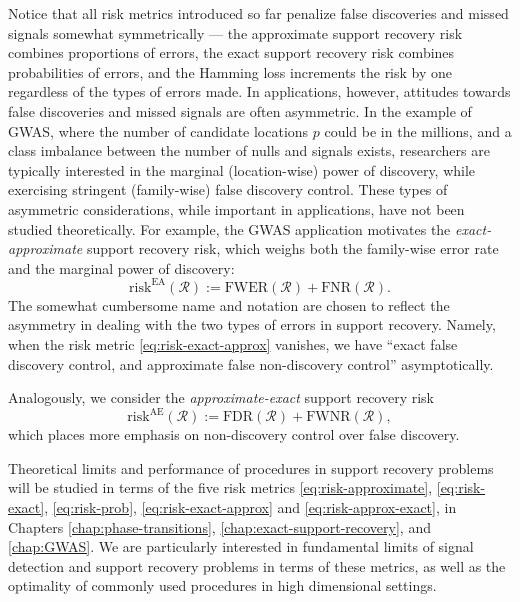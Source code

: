 Notice that all risk metrics introduced so far penalize false discoveries and missed signals somewhat symmetrically --- the approximate support recovery risk combines proportions of errors, the exact support recovery risk combines probabilities of errors, and the Hamming loss increments the risk by one regardless of the types of errors made.
In applications, however, attitudes towards false discoveries and missed signals are often asymmetric.
In the example of GWAS, where the number of candidate locations $p$ could be in the millions, and a class imbalance between the number of nulls and signals exists, researchers are typically interested in the marginal (location-wise) power of discovery, while exercising stringent (family-wise) false discovery control. 
These types of asymmetric considerations, while important in applications, have not been studied theoretically.  
For example, the GWAS application motivates the \emph{exact-approximate} support recovery risk, which weighs both the family-wise error rate and the marginal power of discovery:
\begin{equation} \label{eq:risk-exact-approx}
    \mathrm{risk}^{\mathrm{EA}}(\mathcal{R}) := \mathrm{FWER}(\mathcal{R}) + \mathrm{FNR}(\mathcal{R}).
\end{equation}
The somewhat cumbersome name and notation are chosen to reflect
the asymmetry in dealing with the two types of errors in support recovery.
Namely, when the risk metric \eqref{eq:risk-exact-approx} vanishes, we have ``exact false discovery control, and approximate false non-discovery control'' asymptotically.

Analogously, we consider the \emph{approximate-exact} support recovery risk
\begin{equation} \label{eq:risk-approx-exact}
    \mathrm{risk}^{\mathrm{AE}}(\mathcal{R}) := \mathrm{FDR}(\mathcal{R}) + \mathrm{FWNR}(\mathcal{R}),
\end{equation}
which places more emphasis on non-discovery control over false discovery.

Theoretical limits and performance of procedures in support recovery problems will be studied in terms of the five risk metrics \eqref{eq:risk-approximate}, \eqref{eq:risk-exact}, \eqref{eq:risk-prob}, \eqref{eq:risk-exact-approx} and \eqref{eq:risk-approx-exact}, in Chapters \ref{chap:phase-transitions}, \ref{chap:exact-support-recovery}, and \ref{chap:GWAS}.
We are particularly interested in fundamental limits of signal detection and support recovery problems in terms of these metrics, as well as the optimality of commonly used procedures in high dimensional settings. 

